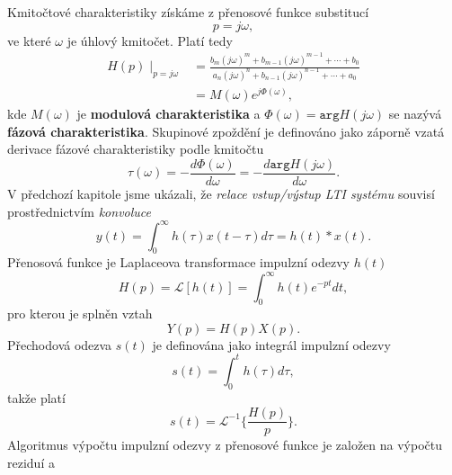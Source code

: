       Kmitočtové charakteristiky získáme z přenosové funkce substitucí
      \begin{equation}\label{SAS:eq_p_jomega}
          p = j\omega,
      \end{equation}
      ve které $\omega$ je úhlový kmitočet. Platí tedy
      \begin{align}
          H(p)\mid_{p = j\omega} 
            &=\frac{b_m(j\omega)^m+b_{m-1}(j\omega)^{m-1}                     
             +\cdots+b_0}{a_n(j\omega)^n+b_{n-1}(j\omega)^{n-1}+\cdots+a_0}      \nonumber \\
            &=M(\omega)e^{j\Phi(\omega)},                                        \label{tky:eq003}
      \end{align}
      kde $M(\omega)$ je \textbf{modulová charakteristika} a $\Phi(\omega)=\texttt{arg}H(j\omega)$ 
      se nazývá \textbf{fázová charakteristika}. Skupinové zpoždění je definováno jako záporně vzatá
      derivace fázové charakteristiky podle kmitočtu
      \begin{equation}\label{SAS:eq_skupinove_zpozdeni}
          \tau(\omega)=-\frac{d\Phi(\omega)}{d\omega}= - \frac{d \texttt{arg} H(j\omega)}{d\omega}.
      \end{equation}
      V předchozí kapitole jsme ukázali, že \emph{relace vstup/výstup LTI systému} souvisí
      pro\-střed\-nic\-tvím \emph{konvoluce}
      \begin{equation}\label{SAS:eq_popis_konvoluce}
          y(t)=\int_0^\infty h(\tau)x(t-\tau)d\tau = h(t)*x(t).
      \end{equation}
      Přenosová funkce je Laplaceova transformace impulzní odezvy $h(t)$
      \begin{equation}\label{SAS:eq_ht_Lap_trans_imp}
          H(p)=\mathcal{L}[h(t)]=\int_0^\infty h(t)e^{-pt}dt,
      \end{equation}
      pro kterou je splněn vztah
      \begin{equation}\label{SAS:eq_Yp}
          Y(p)=H(p)X(p).
      \end{equation}
      Přechodová odezva $s(t)$ je definována jako integrál impulzní odezvy
      \begin{equation}\label{SAS:eq_Prechod_odezva}
          s(t)=\int_0^th(\tau)d\tau,
      \end{equation}
      takže platí
      \begin{equation}\label{SAS:eq_st}
          s(t)=\mathcal{L}^{-1}\{\frac{H(p)}{p}\}.
      \end{equation}
      Algoritmus výpočtu impulzní odezvy z přenosové funkce je založen na výpočtu  reziduí a 

